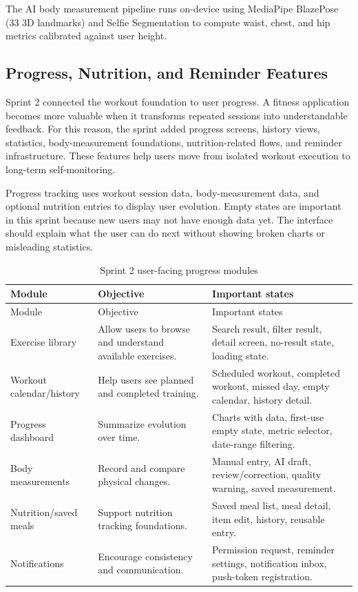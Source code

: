 \documentclass[12pt,a4paper,openany]{report}
\begin{document}
The AI body measurement pipeline runs on-device using MediaPipe BlazePose (33 3D landmarks) and Selfie Segmentation to compute waist, chest, and hip metrics calibrated against user height.


\subsection{Progress, Nutrition, and Reminder Features}

Sprint 2 connected the workout foundation to user progress. A fitness application becomes more valuable when it transforms repeated sessions into understandable feedback. For this reason, the sprint added progress screens, history views, statistics, body-measurement foundations, nutrition-related flows, and reminder infrastructure. These features help users move from isolated workout execution to long-term self-monitoring.


Progress tracking uses workout session data, body-measurement data, and optional nutrition entries to display user evolution. Empty states are important in this sprint because new users may not have enough data yet. The interface should explain what the user can do next without showing broken charts or misleading statistics.


\begingroup
\footnotesize
\setlength{\tabcolsep}{3pt}
\renewcommand{\arraystretch}{1.20}
\setlength{\LTpre}{5pt}
\setlength{\LTpost}{10pt}
\begin{longtable}{|L{3.67cm}|L{5.29cm}|L{5.73cm}|}
\caption{Sprint 2 user-facing progress modules}\label{tab:pdf-56-25} \\
\hline
{}
Module & Objective & Important states \\ \hline
\endfirsthead
\hline
{}
Module & Objective & Important states \\ \hline
\endhead
Exercise library & Allow users to browse and understand available exercises. & Search result, filter result, detail screen, no-result state, loading state. \\ \hline
Workout calendar/history & Help users see planned and completed training. & Scheduled workout, completed workout, missed day, empty calendar, history detail. \\ \hline
Progress dashboard & Summarize evolution over time. & Charts with data, first-use empty state, metric selector, date-range filtering. \\ \hline
Body measurements & Record and compare physical changes. & Manual entry, AI draft, review/correction, quality warning, saved measurement. \\ \hline
Nutrition/saved meals & Support nutrition tracking foundations. & Saved meal list, meal detail, item edit, history, reusable entry. \\ \hline
Notifications & Encourage consistency and communication. & Permission request, reminder settings, notification inbox, push-token registration. \\ \hline
\end{longtable}
\endgroup
\end{document}
